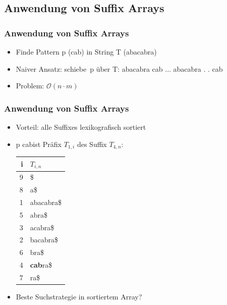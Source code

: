 \documentclass{beamer}
\begin{document}
\subsection{Anwendung von Suffix Arrays}
\begin{frame}
\frametitle{Anwendung von Suffix Arrays}
\begin{itemize}
\item Finde Pattern p (\glqq cab\grqq) in String T (\glqq abacabra\grqq)
\item Naiver Ansatz: \glqq schiebe\grqq\ p über T: \newline
{\ttfamily
abacabra \newline
cab\textrightarrow \newline
...\newline
abacabra \newline
. . cab
}
\item Problem: $\mathcal{O}(n\cdot m)$
\end{itemize}
\end{frame}
%
\begin{frame}
\frametitle{Anwendung von Suffix Arrays}
\begin{itemize}
\item Vorteil: alle Suffixes lexikografisch sortiert
\item p \glqq cab\grqq ist Präfix $T_{1,i}$ des Suffix $T_{4,n}$: \newline
\begin{tabular}{r|l<{\ttfamily}}
\textbf{i} & \textbf{$T_{i,n}$}\\\hline
9 & \$\\
8 & a\$\\
1 & abacabra\$\\
5 & abra\$\\
3 & acabra\$\\
2 & bacabra\$\\
6 & bra\$\\
4 & {\color{red}\textbf{cab}}ra\$\\
7 & ra\$\\
\end{tabular}
\item Beste Suchstrategie in sortiertem Array?
\end{itemize}
\end{frame}
%
\end{document}
